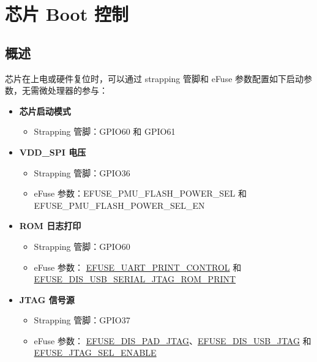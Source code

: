 \documentclass[main\_\_CN.tex]{subfiles}
\begin{document}
\setchineseformatting


\ifglobal
\else
    \clearpage
    \listoftodos
    \listofdonetodos
    \tableofcontents
\fi



\hypertarget{bootctrl}{}
\chapter{芯片 Boot 控制}
\label{mod:bootctrl}

\section{概述}
\label{sec:bootctrl-overview}

芯片在上电或硬件复位时，可以通过 strapping 管脚和 eFuse 参数配置如下启动参数，无需微处理器的参与：

\begin{itemize}
    \item \textbf{芯片启动模式}
        \begin{itemize}
            \item Strapping 管脚：GPIO60 和 GPIO61
        \end{itemize}

    \item \textbf{VDD\_SPI 电压}
    \begin{itemize}
        \item Strapping 管脚：GPIO36
        \item eFuse 参数：EFUSE\_PMU\_FLASH\_POWER\_SEL 和 EFUSE\_PMU\_FLASH\_POWER\_SEL\_EN
    \end{itemize}


    \item \textbf{ROM 日志打印}
        \begin{itemize}
            \item Strapping 管脚：GPIO60
            \item eFuse 参数： \hyperref[fielddesc:EFUSEUARTPRINTCONTROL]{EFUSE\_UART\_PRINT\_CONTROL} 和 \hyperref[fielddesc:EFUSEDISUSBSERIALJTAGROMPRINT]{EFUSE\_DIS\_USB\_SERIAL\_JTAG\_ROM\_PRINT}
        \end{itemize}

    \item \textbf{JTAG 信号源}
        \begin{itemize}
            \item Strapping 管脚：GPIO37
            \item eFuse 参数： \hyperref[fielddesc:EFUSEDISPADJTAG]{EFUSE\_DIS\_PAD\_JTAG}、\hyperref[fielddesc:EFUSEDISUSBJTAG]{EFUSE\_DIS\_USB\_JTAG} 和 \hyperref[fielddesc:EFUSEJTAGSELENABLE]{EFUSE\_JTAG\_SEL\_ENABLE}
        \end{itemize}

\end{itemize}
\end{document}
